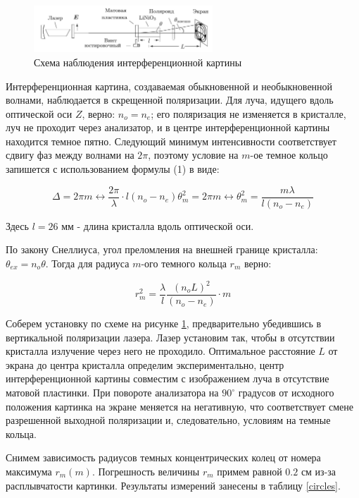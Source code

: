 \documentclass[a4paper,12pt]{article}
\begin{document}
	\begin{figure}[h]
		\centering	
		\includegraphics[width=0.6\textwidth]{shema.png}
		\caption{Схема наблюдения интерференционной картины}
		\label{shema}
	\end{figure}
	
	Интерференционная картина, создаваемая обыкновенной и необыкновенной волнами, наблюдается в скрещенной поляризации. Для луча, идущего вдоль оптической оси $Z$, верно: $n_o = n_e$; его поляризация не изменяется в кристалле, луч не проходит через анализатор, и в центре интерференционной картины находится темное пятно. Следующий минимум интенсивности соответствует сдвигу фаз между волнами на $2\pi$, поэтому условие на $m$-ое темное кольцо запишется с использованием формулы (1) в виде:
	
	\[ \Delta = 2\pi m \leftrightarrow \frac{2\pi}{\lambda}\cdot l (n_o - n_e)\theta_m^2 = 2\pi m \leftrightarrow \theta_m^2 = \frac{m\lambda}{l(n_o - n_e)} \] 
	
	Здесь $l = 26$ мм - длина кристалла вдоль оптической оси.
	
	По закону Снеллиуса, угол преломления на внешней границе кристалла: $\theta_{ex} = n_o\theta$. Тогда для радиуса $m$-ого темного кольца $r_m$ верно: 
	
	\begin{equation}	
	r_m^2 = \frac{\lambda}{l} \frac{(n_oL)^2}{(n_o - n_e)} \cdot m
	\label{eq1}
	\end{equation}
	
	Соберем установку по схеме на рисунке \ref{shema}, предварительно убедившись в вертикальной поляризации лазера. Лазер установим так, чтобы в отсутствии кристалла излучение через него не проходило. Оптимальное расстояние $L$ от экрана до центра кристалла определим экспериментально, центр интерференционной картины совместим с изображением луча в отсутствие матовой пластинки. При повороте анализатора на $90^\circ$ градусов от исходного положения картинка на экране меняется на негативную, что соответствует смене разрешенной выходной поляризации и, следовательно, условиям на темные кольца. 
	
	Снимем зависимость радиусов темных концентрических колец от номера максимума $r_m(m)$. Погрешность величины $r_m$ примем равной $0.2$ см из-за расплывчатости картинки. Результаты измерений занесены в таблицу \ref{circles}. 
\end{document}
